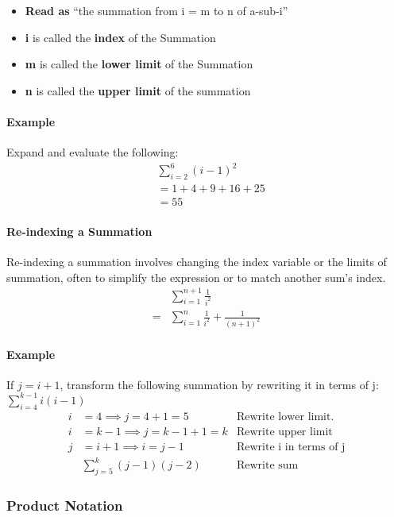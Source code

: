 \begin{itemize}
    \item \textbf{Read as} ``the summation from i = m to n of a-sub-i''
    \item \textbf{i} is called the \textbf{index} of the Summation
    \item \textbf{m} is called the \textbf{lower limit} of the Summation
    \item \textbf{n} is called the \textbf{upper limit} of the summation
\end{itemize}

\paragraph*{Example}
Expand and evaluate the following:
\begin{align*}
    &\sum_{i=2}^6 (i-1)^2\\
    &= 1 + 4 + 9 + 16 + 25\\
    &= 55
\end{align*}

\paragraph*{Re-indexing a Summation}
Re-indexing a summation involves changing the index variable or the limits of summation, often to simplify the expression or to match 
another sum's index.
\begin{align*}
    &\sum_{i=1}^{n+1} \frac{1}{i^2}\\
    = &\sum_{i=1}^{n} \frac{1}{i^2} + \frac{1}{(n+1)^2}
\end{align*}

\paragraph*{Example}
If $j=i+1$, transform the following summation by rewriting it in terms of j: $\sum_{i=4}^{k-1} i(i-1)$
\begin{align*}
    i &= 4 \implies j = 4 + 1 = 5 & \text{Rewrite lower limit.}\\
    i &= k - 1 \implies j = k - 1 + 1 = k & \text{Rewrite upper limit}\\
    j &= i + 1 \implies i = j - 1 & \text{Rewrite i in terms of j}\\
    & \sum_{j=5}^{k} (j-1)(j-2) & \text{Rewrite sum}
\end{align*}

\subsubsection{Product Notation}
